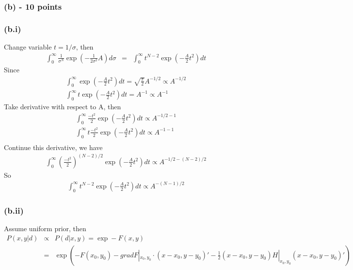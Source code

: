 \documentclass[11pt]{article}
\begin{document}




\subsubsection*{(b) - 10 points}
\subsubsection*{(b.i)}
Change variable $t=1/\sigma$, then
\begin{eqnarray*}
\int_0^{\infty} \frac{1}{\sigma^N} \exp\left( -\frac{1}{2\sigma^2} A \right) d\sigma 
 & = &
 \int_0^{\infty} t^{N-2} \exp\left( -\frac{A}{2} t^2 \right) dt 
\end{eqnarray*}
Since
\begin{eqnarray*}
\int_0^{\infty} \exp\left( -\frac{A}{2} t^2 \right) dt = \sqrt{\frac{\pi}{2}} A^{-1/2} \propto A^{-1/2} \\
  \int_0^{\infty} t \exp\left( -\frac{A}{2} t^2 \right) dt = A^{-1} \propto A^{-1}
\end{eqnarray*}
Take derivative with respect to A, then
\begin{eqnarray*}
 \int_0^{\infty} \frac{-t^2}{2}\exp\left( -\frac{A}{2} t^2 \right) dt \propto A^{-1/2 -1} \\
  \int_0^{\infty} t \frac{-t^2}{2}\exp\left( -\frac{A}{2} t^2 \right) dt \propto A^{-1 -1} \\
\end{eqnarray*}
Continue this derivative, we have
\begin{eqnarray*}
 \int_0^{\infty} \left(\frac{-t^2}{2}\right)^{(N-2)/2}\exp\left( -\frac{A}{2} t^2 \right) dt \propto A^{-1/2 - (N-2)/2} 
\end{eqnarray*}
So
\begin{eqnarray*}
 \int_0^{\infty} t^{N-2}\exp\left( -\frac{A}{2} t^2 \right) dt \propto A^{-(N-1)/2} 
\end{eqnarray*}

\subsubsection*{(b.ii)}
Assume uniform prior, then
\begin{eqnarray*}
P(x,y | d ) &\propto & P( d | x,y)  =  \exp -F(x,y) \\
&= & \exp \left(
-F(x_0, y_0) 
- grad F|_{x_0,y_0} \cdot (x-x_0, y-y_0)'
 - \frac{1}{2} (x-x_0, y-y_0) H|_{x_0,y_0} (x-x_0, y-y_0)'
 \right)
\end{eqnarray*}
\end{document}
